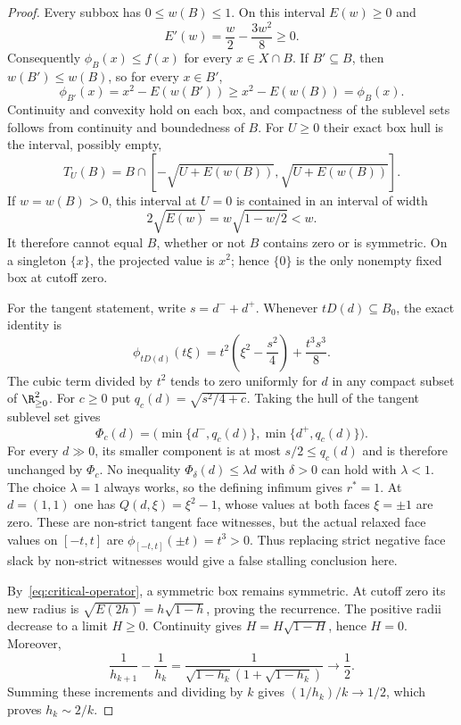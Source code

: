 \begin{proof}
Every subbox has $0\le w(B)\le1$. On this interval $E(w)\ge0$ and
\[
  E'(w)=\frac{w}{2}-\frac{3w^2}{8}\ge0.
\]
Consequently $\phi_B(x)\le f(x)$ for every $x\in X\cap B$. If
$B'\subseteq B$, then $w(B')\le w(B)$, so for every $x\in B'$,
\[
  \phi_{B'}(x)=x^2-E(w(B'))\ge x^2-E(w(B))=\phi_B(x).
\]
Continuity and convexity hold on each box, and compactness of the sublevel
sets follows from continuity and boundedness of $B$. For $U\ge0$ their
exact box hull is the interval, possibly empty,
\begin{equation}\label{eq:critical-operator}
  T_U(B)=B\cap
  [-\sqrt{U+E(w(B))},\sqrt{U+E(w(B))}].
\end{equation}
If $w=w(B)>0$, this interval at $U=0$ is contained in an interval of width
\[
  2\sqrt{E(w)}=w\sqrt{1-w/2}<w.
\]
It therefore cannot equal $B$, whether or not $B$ contains zero or is
symmetric. On a singleton $\{x\}$, the projected value is $x^2$; hence
$\{0\}$ is the only nonempty fixed box at cutoff zero.

For the tangent statement, write $s=d^-+d^+$. Whenever $tD(d)\subseteq B_0$,
the exact identity is
\[
  \phi_{tD(d)}(t\xi)
  =t^2\left(\xi^2-\frac{s^2}{4}\right)+\frac{t^3s^3}{8}.
\]
The cubic term divided by $t^2$ tends to zero uniformly for $d$ in any
compact subset of $\R^2_{\ge0}$. For $c\ge0$ put
$q_c(d)=\sqrt{s^2/4+c}$. Taking the hull of the tangent sublevel set gives
\[
  \Phi_c(d)=
  \bigl(\min\{d^-,q_c(d)\},\min\{d^+,q_c(d)\}\bigr).
\]
For every $d\gg0$, its smaller component is at most $s/2\le q_c(d)$
and is therefore unchanged by $\Phi_c$. No inequality
$\Phi_\delta(d)\le\lambda d$ with $\delta>0$ can hold with $\lambda<1$.
The choice $\lambda=1$ always works, so the defining infimum gives
$r^*=1$. At $d=(1,1)$ one has $Q(d,\xi)=\xi^2-1$, whose values at both
faces $\xi=\pm1$ are zero. These are non-strict tangent face witnesses,
but the actual relaxed face values on $[-t,t]$ are
$\phi_{[-t,t]}(\pm t)=t^3>0$. Thus replacing strict negative face slack
by non-strict witnesses would give a false stalling conclusion here.

By~\eqref{eq:critical-operator}, a symmetric box remains symmetric. At
cutoff zero its new radius is $\sqrt{E(2h)}=h\sqrt{1-h}$, proving the
recurrence. The positive radii decrease to a limit $H\ge0$. Continuity
gives $H=H\sqrt{1-H}$, hence $H=0$. Moreover,
\[
  \frac1{h_{k+1}}-\frac1{h_k}
  =\frac1{\sqrt{1-h_k}(1+\sqrt{1-h_k})}\longrightarrow\frac12.
\]
Summing these increments and dividing by $k$ gives
$(1/h_k)/k\to1/2$, which proves $h_k\sim2/k$.


\end{proof}
